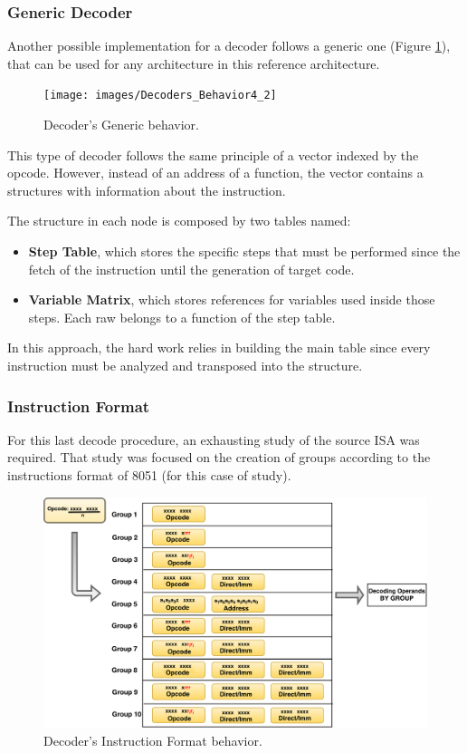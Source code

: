 \documentclass[12pt]{article}
\begin{document}
{\subsubsection{Generic Decoder}

Another possible implementation for a decoder follows a generic one (Figure \ref{fig:Decoders_Behavior4}), that can be used for any architecture in this reference architecture.  


\begin{figure}[!htb]
\centerline{
\texttt{[image: images/Decoders\_Behavior4\_2]}
}
\caption{Decoder's Generic behavior.}
\label{fig:Decoders_Behavior4} 
\end{figure}

This type of decoder follows the same principle of a vector indexed by the opcode. However, instead of an address of a function, the vector contains a structures with information about the instruction. 

The structure in each node is composed by two tables named:
\begin{itemize}
\item \textbf{Step Table}, which stores the specific steps that must be performed since the fetch of the instruction until the generation of target code.
\item \textbf{Variable Matrix}, which stores references for variables used inside those steps. Each raw belongs to a function of the step table.
\end{itemize}

In this approach, the hard work relies in building the main table since every instruction must be analyzed and transposed into the structure.  


    \subsubsection{Instruction Format}
    For this last decode procedure, an exhausting study of the source ISA was required. That study was focused on the creation of groups according to the instructions format of 8051 (for this case of study).
    
   
    \begin{figure}[!htb]
    \centerline{
    \includegraphics[scale=0.4]{images/Decoders_Behaviors3}
    }
    \caption{Decoder's Instruction Format behavior.}
    \label{fig:Decoders_Behavior3} 
    \end{figure}
	
}
\end{document}
